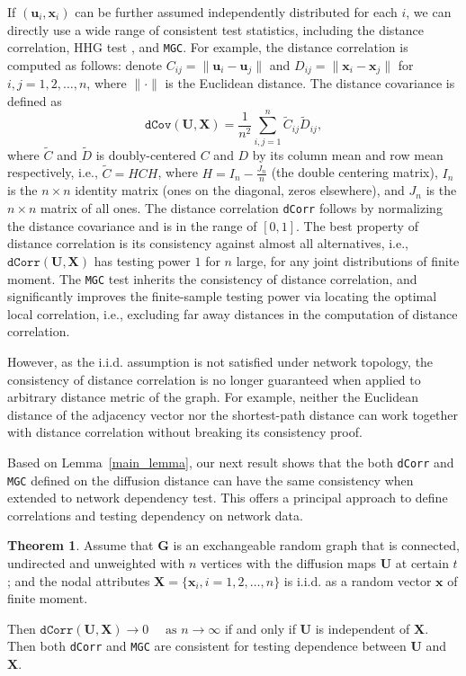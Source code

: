 \documentclass[11pt]{article}
\theoremstyle{definition}
\newtheorem{theorem}{Theorem}[section]
\begin{document}
If $(\mathbf{u}_{i}, \mathbf{x}_{i} )$ can be further assumed independently distributed for each $i$, we can directly use a wide range of consistent test statistics, including the distance correlation, HHG test \cite{HellerGorfine2013}, and \texttt{MGC}. For example, the distance correlation is computed as follows: denote $C_{ij} = \parallel \mathbf{u}_{i} - \mathbf{u}_{j} \parallel$ and $D_{ij} = \parallel \mathbf{x}_{i} - \mathbf{x}_{j} \parallel$ for $i,j=1,2, \ldots ,n$, where $\parallel \cdot \parallel$ is the Euclidean distance. The distance covariance is defined as 
\begin{equation}	 
\label{eq:dCov}
\texttt{dCov}(\mathbf{U}, \mathbf{X}) = \frac{1}{n^2} \sum\limits_{i,j=1}^{n} \tilde{C}_{ij} \tilde{D}_{ij},
\end{equation}
where $\tilde{C}$ and $\tilde{D}$ is doubly-centered $C$ and $D$ by its column mean and row mean respectively, i.e., $\tilde{C}=HCH$, where $H=I_{n}-\frac{J_{n}}{n}$ (the double centering matrix), $I_n$ is the $n \times n$ identity matrix (ones on the diagonal, zeros elsewhere), and $J_n$ is the $n \times n$ matrix of all ones. The distance correlation \texttt{dCorr} follows by normalizing the distance covariance and is in the range of $[0,1]$. The best property of distance correlation is its consistency against almost all alternatives, i.e., $\texttt{dCorr}(\mathbf{U}, \mathbf{X})$ has testing power $1$ for $n$ large, for any joint distributions of finite moment. The \texttt{MGC} test inherits the consistency of distance correlation, and significantly improves the finite-sample testing power via locating the optimal local correlation, i.e., excluding far away distances in the computation of distance correlation.

However, as the i.i.d. assumption is not satisfied under network topology, the consistency of distance correlation is no longer guaranteed when applied to arbitrary distance metric of the graph. For example, neither the Euclidean distance of the adjacency vector nor the shortest-path distance can work together with distance correlation without breaking its consistency proof. 

Based on Lemma~\ref{main_lemma}, our next result shows that the both \texttt{dCorr} and \texttt{MGC} defined on the diffusion distance can have the same consistency when extended to network dependency test. This offers a principal approach to define correlations and testing dependency on network data. 

\begin{theorem}
Assume that $\mathbf{G}$ is an exchangeable random graph that is connected, undirected and unweighted with $n$ vertices with the diffusion maps $\mathbf{U}$ at certain $t$; and the nodal attributes $\mathbf{X}=\{ \mathbf{x}_{i}, i = 1,2, \ldots, n \}$ is i.i.d. as a random vector $\mathbf{x}$ of finite moment. 

Then $\texttt{dCorr}(\mathbf{U}, \mathbf{X}) \longrightarrow 0 \quad \mbox{ as } n \rightarrow \infty$ if and only if $\mathbf{U}$ is independent of $\mathbf{X}$. Then both \texttt{dCorr} and \texttt{MGC} are consistent for testing dependence between $\mathbf{U}$ and $\mathbf{X}$.
	\label{theoremMain}
\end{theorem}
\end{document}
